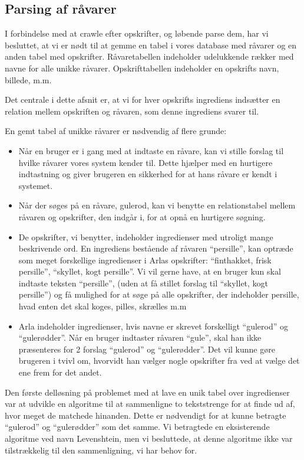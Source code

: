\subsection{Parsing af råvarer}
\label{subsec:parsingafraavarer}
I forbindelse med at crawle efter opskrifter, og løbende parse dem, har vi besluttet, at vi er nødt til at gemme en tabel i vores database med råvarer og en anden tabel med opskrifter. Råvaretabellen indeholder udelukkende rækker med navne for alle unikke råvarer. Opskrifttabellen indeholder en opskrifts navn, billede, m.m.

Det centrale i dette afsnit er, at vi for hver opskrifts ingrediens indsætter en relation mellem opskriften og råvaren, som denne ingrediens svarer til.

En gemt tabel af unikke råvarer er nødvendig af flere grunde:

\begin{itemize}[noitemsep]
\item Når en bruger er i gang med at indtaste en råvare, kan vi stille forslag til hvilke råvarer vores system kender til. Dette hjælper med en hurtigere indtastning og giver brugeren en sikkerhed for at hans råvare er kendt i systemet.
\item Når der søges på en råvare, \fx gulerod, kan vi benytte en relationstabel mellem råvaren og opskrifter, den indgår i, for at opnå en hurtigere søgning.
\item De opskrifter, vi benytter, indeholder ingredienser med utroligt mange beskrivende ord. En ingrediens bestående af råvaren “persille”, kan optræde som meget forskellige ingredienser i Arlas opskrifter: ``finthakket, frisk persille'', ``skyllet, kogt persille''. Vi vil gerne have, at en bruger kun skal indtaste teksten ``persille'', (uden at få stillet forslag til ``skyllet, kogt persille'') og få mulighed for at søge på alle opskrifter, der indeholder persille, hvad enten det skal koges, pilles, skrælles m.m
\item Arla indeholder ingredienser, hvis navne er skrevet forskelligt \fx ``gulerod'' og ``gulerødder''. Når en bruger indtaster råvaren ``gule'', skal han ikke præsenteres for 2 forslag ``gulerod'' og ``gulerødder''. Det vil kunne gøre brugeren i tvivl om, hvorvidt han vælger nogle opskrifter fra ved at vælge det ene frem for det andet.
\end{itemize}

Den første delløsning på problemet med at lave en unik tabel over ingredienser var at udvikle en algoritme til at sammenligne to tekststrenge for at finde ud af, hvor meget de matchede hinanden. Dette er nødvendigt for at kunne betragte ``gulerod'' og ``gulerødder'' som det samme. Vi betragtede en eksisterende algoritme ved navn Levenshtein, men vi besluttede, at denne algoritme ikke var tilstrækkelig til den sammenligning, vi har behov for. 

